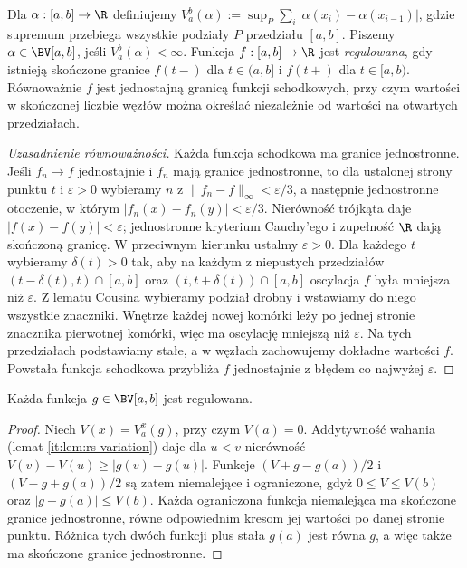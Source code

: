 \begin{definicja}
Dla $\alpha:[a,b]\to\R$ definiujemy $V_a^b(\alpha):=\sup_P\sum_i|\alpha(x_i)-\alpha(x_{i-1})|$, gdzie supremum przebiega wszystkie podziały $P$ przedziału $[a,b]$. Piszemy $\alpha\in\BV[a,b]$, jeśli $V_a^b(\alpha)<\infty$. Funkcja $f:[a,b]\to\R$ jest \emph{regulowana}, gdy istnieją skończone granice $f(t-)$ dla $t\in(a,b]$ i $f(t+)$ dla $t\in[a,b)$. Równoważnie $f$ jest jednostajną granicą funkcji schodkowych, przy czym wartości w skończonej liczbie węzłów można określać niezależnie od wartości na otwartych przedziałach.
\end{definicja}
\begin{proof}[Uzasadnienie równoważności]
Każda funkcja schodkowa ma granice jednostronne. Jeśli $f_n\to f$ jednostajnie i $f_n$ mają granice jednostronne, to dla ustalonej strony punktu $t$ i $\varepsilon>0$ wybieramy $n$ z $\|f_n-f\|_\infty<\varepsilon/3$, a następnie jednostronne otoczenie, w którym $|f_n(x)-f_n(y)|<\varepsilon/3$. Nierówność trójkąta daje $|f(x)-f(y)|<\varepsilon$; jednostronne kryterium Cauchy'ego i zupełność $\R$ dają skończoną granicę. W przeciwnym kierunku ustalmy $\varepsilon>0$. Dla każdego $t$ wybieramy $\delta(t)>0$ tak, aby na każdym z niepustych przedziałów $(t-\delta(t),t)\cap[a,b]$ oraz $(t,t+\delta(t))\cap[a,b]$ oscylacja $f$ była mniejsza niż $\varepsilon$. Z lematu Cousina wybieramy podział drobny i wstawiamy do niego wszystkie znaczniki. Wnętrze każdej nowej komórki leży po jednej stronie znacznika pierwotnej komórki, więc ma oscylację mniejszą niż $\varepsilon$. Na tych przedziałach podstawiamy stałe, a w węzłach zachowujemy dokładne wartości $f$. Powstała funkcja schodkowa przybliża $f$ jednostajnie z błędem co najwyżej $\varepsilon$.
\end{proof}

\begin{lemat}\label{it:lem:ks-bv-regulated}
Każda funkcja $g\in\BV[a,b]$ jest regulowana.
\end{lemat}
\begin{proof}
Niech $V(x)=V_a^x(g)$, przy czym $V(a)=0$. Addytywność wahania (lemat \ref{it:lem:rs-variation}) daje dla $u<v$ nierówność $V(v)-V(u)\ge|g(v)-g(u)|$. Funkcje $(V+g-g(a))/2$ i $(V-g+g(a))/2$ są zatem niemalejące i ograniczone, gdyż $0\le V\le V(b)$ oraz $|g-g(a)|\le V(b)$. Każda ograniczona funkcja niemalejąca ma skończone granice jednostronne, równe odpowiednim kresom jej wartości po danej stronie punktu. Różnica tych dwóch funkcji plus stała $g(a)$ jest równa $g$, a więc także ma skończone granice jednostronne.
\end{proof}

